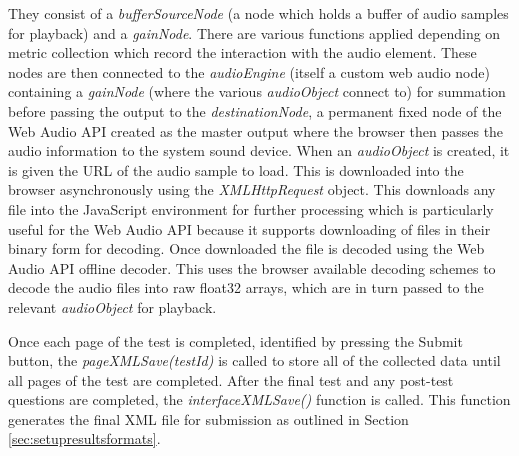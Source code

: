 \documentclass{article}
\begin{document}
They consist of a \textit{bufferSourceNode} (a node which holds a buffer of audio samples for playback) and a \textit{gainNode}. There are various functions applied depending on metric collection which record the interaction with the audio element. These nodes are then connected to the \textit{audioEngine} (itself a custom web audio node) containing a \textit{gainNode} (where the various \textit{audioObject} connect to) for summation before passing the output to the \textit{destinationNode}, a permanent fixed node of the Web Audio API created as the master output where the browser then passes the audio information to the system sound device. %
When an \textit{audioObject} is created, it is given the URL of the audio sample to load. This is downloaded into the browser asynchronously using the \textit{XMLHttpRequest} object. This downloads any file into the JavaScript environment for further processing which is particularly useful for the Web Audio API because it supports downloading of files in their binary form for decoding. Once downloaded the file is decoded using the Web Audio API offline decoder. This uses the browser available decoding schemes to decode the audio files into raw float32 arrays, which are in turn passed to the relevant \textit{audioObject} for playback.

Once each page of the test is completed, identified by pressing the Submit button, the \textit{pageXMLSave(testId)} is called to store all of the collected data until all pages of the test are completed. After the final test and any post-test questions are completed, the \textit{interfaceXMLSave()} function is called. This function generates the final XML file for submission as outlined in Section \ref{sec:setupresultsformats}.
\end{document}
